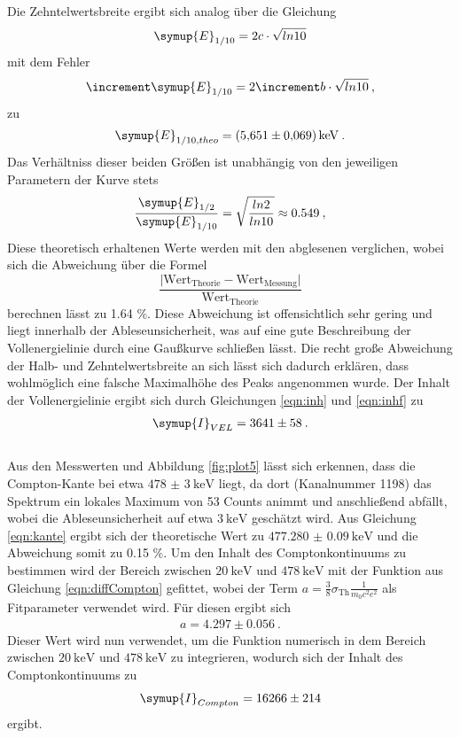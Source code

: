 Die Zehntelwertsbreite ergibt sich analog über die Gleichung
\begin{equation}
  \symup{E}_{1/10} = 2c\cdot\sqrt{ln10}
\end{equation}
mit dem Fehler
\begin{equation}
  \increment \symup{E}_{1/10} = 2\increment b\cdot\sqrt{ln10} \: ,
\end{equation}
zu
\begin{align*}
  \symup{E}_{1/10, theo} = \SI{5.651(69)}{\kilo\electronvolt} \: .
\end{align*}
Das Verhältniss dieser beiden Größen ist unabhängig von den jeweiligen Parametern der
Kurve stets
\begin{equation}
  \frac{\symup{E}_{1/2}}{\symup{E}_{1/10}} = \sqrt{\frac{ln2}{ln10}}
  \approx 0.549 \: ,
\end{equation}
Diese theoretisch erhaltenen Werte werden mit den abglesenen verglichen, wobei sich
die Abweichung über die Formel
\begin{equation}
  \frac{\lvert \text{Wert}_{\text{Theorie}}-\text{Wert}_{\text{Messung}}\rvert}{\text{Wert}_{\text{Theorie}}}
  \label{eqn:abw}
\end{equation}
berechnen lässt zu 1.64 \%. Diese Abweichung ist offensichtlich sehr gering und liegt innerhalb der
Ableseunsicherheit, was auf eine gute Beschreibung der Vollenergielinie
durch eine Gaußkurve schließen lässt. Die recht große Abweichung der Halb- und Zehntelwertsbreite
an sich lässt sich dadurch erklären, dass wohlmöglich eine falsche Maximalhöhe des Peaks angenommen
wurde.
Der Inhalt der Vollenergielinie ergibt sich durch Gleichungen \ref{eqn:inh}
und \ref{eqn:inhf} zu
\begin{align*}
  \symup{I}_{VEL} =  3641 \pm 58 \: .
\end{align*}
\\
Aus den Messwerten und Abbildung \ref{fig:plot5} lässt sich erkennen, dass die
Compton-Kante bei etwa $\SI{478(3)}{\kilo\electronvolt}$ liegt, da dort (Kanalnummer
1198) das Spektrum ein lokales
Maximum von 53 Counts animmt und anschließend abfällt, wobei die Ableseunsicherheit auf etwa
$\SI{3}{\kilo\electronvolt}$ geschätzt wird.
Aus Gleichung \ref{eqn:kante} ergibt sich der theoretische Wert zu $\SI{477.280(90)}{\kilo\electronvolt}$
und die Abweichung somit zu 0.15 \%.
Um den Inhalt des Comptonkontinuums zu bestimmen wird der Bereich zwischen $\SI{20}{\kilo\electronvolt}$
und $\SI{478}{\kilo\electronvolt}$ mit der Funktion aus Gleichung \ref{eqn:diffCompton} gefittet,
wobei der Term $a =\frac{3}{8}\sigma_{\text{Th}}\frac{1}{m_0 c^2 e^2}$ als Fitparameter
verwendet wird. Für diesen ergibt sich
\begin{align*}
  a =  4.297 \pm 0.056 \: .
\end{align*}
Dieser Wert wird nun verwendet, um die Funktion numerisch in dem Bereich zwischen $\SI{20}{\kilo\electronvolt}$
und $\SI{478}{\kilo\electronvolt}$
zu integrieren, wodurch sich der Inhalt des Comptonkontinuums zu
\begin{align*}
  \symup{I}_{Compton} =  16266 \pm 214
\end{align*}
ergibt.

